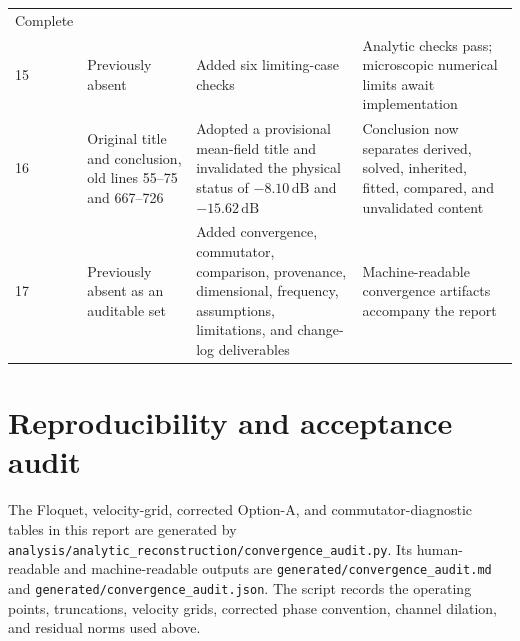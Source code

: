 \documentclass[11pt,a4paper]{article}
\newcommand{\dB}{\,\mathrm{dB}}
\begin{document}
\begin{longtable}{C{0.65cm}L{4.2cm}L{5.2cm}L{4.3cm}}
Complete\\
15 & Previously absent &
Added six limiting-case checks &
Analytic checks pass; microscopic numerical limits await implementation\\
16 & Original title and conclusion, old lines 55--75 and 667--726 &
Adopted a provisional mean-field title and invalidated the physical status
of $-8.10\dB$ and $-15.62\dB$ &
Conclusion now separates derived, solved, inherited, fitted, compared, and
unvalidated content\\
17 & Previously absent as an auditable set &
Added convergence, commutator, comparison, provenance, dimensional,
frequency, assumptions, limitations, and change-log deliverables &
Machine-readable convergence artifacts accompany the report\\
\bottomrule
\end{longtable}

\section{Reproducibility and acceptance audit}
\label{app:reproducibility}

The Floquet, velocity-grid, corrected Option-A, and commutator-diagnostic
tables in this report are generated by
\texttt{analysis/analytic\_reconstruction/convergence\_audit.py}.
Its human-readable and machine-readable outputs are
\texttt{generated/convergence\_audit.md} and
\texttt{generated/convergence\_audit.json}. The script records the operating
points, truncations, velocity grids, corrected phase convention, channel
dilation, and residual norms used above.
\end{document}
